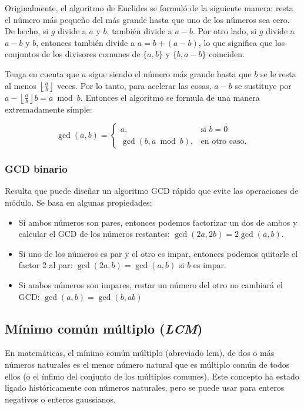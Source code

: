 Originalmente, el algoritmo de Euclides se formuló de la siguiente manera: resta el número más pequeño del más grande hasta que uno de los números sea cero. De hecho, si $g$ divide a $a$ y $b$, también divide a $a-b$. Por otro lado, si $g$ divide a $a-b$ y $b$, entonces también divide a $a = b + (a-b)$, lo que significa que los conjuntos de los divisores comunes de $\{a, b\}$ y $\{b,a-b\}$ coinciden.

Tenga en cuenta que $a$ sigue siendo el número más grande hasta que $b$ se le resta al menos $\left\lfloor\frac{a}{b}\right\rfloor$ veces. Por lo tanto, para acelerar las cosas, $a-b$ se sustituye por $a-\left\lfloor\frac{a}{b}\right\rfloor b = a \bmod b$. Entonces el algoritmo se formula de una manera extremadamente simple:

$$\gcd(a, b) = \begin{cases}
	a,&\text{si }b = 0 \\ 
	\gcd(b, a \bmod b),& \text{en otro caso.}
\end{cases}$$

\subsubsection{GCD binario}

Resulta que puede diseñar un algoritmo GCD rápido que evite las operaciones de módulo. Se basa en algunas propiedades:

\begin{itemize}
	\item Si ambos números son pares, entonces podemos factorizar un dos de ambos y calcular el GCD de los números restantes: $\gcd(2a, 2b) = 2 \gcd(a, b)$.
	\item Si uno de los números es par y el otro es impar, entonces podemos quitarle el factor 2 al par: $\gcd(2a, b) = \gcd(a, b)$ si $b$ es impar.
	\item Si ambos números son impares, restar un número del otro no cambiará el GCD: $\gcd(a, b) = \gcd(b, ab)$
\end{itemize}

\subsection{Mínimo común múltiplo (\emph{LCM})}

En matemáticas, el mínimo común múltiplo (abreviado lcm), de dos o más números naturales es el menor número natural que es múltiplo común de todos ellos (o el ínfimo del conjunto de los múltiplos comunes). Este concepto ha estado ligado históricamente con números naturales, pero se puede usar para enteros negativos o enteros gaussianos.


